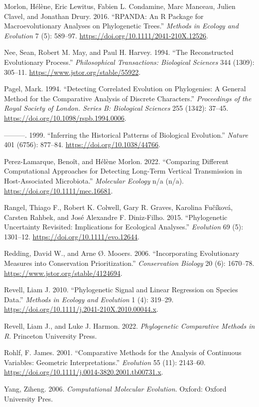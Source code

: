 \documentclass[
]{book}
\newlength{\cslhangindent}
\newenvironment{CSLReferences}[2] %
 {\begin{list}{}{%
  \setlength{\itemindent}{0pt}
  \setlength{\leftmargin}{0pt}
  \setlength{\parsep}{0pt}
  \ifodd #1
   \setlength{\leftmargin}{\cslhangindent}
   \setlength{\itemindent}{-1\cslhangindent}
  \fi
  \setlength{\itemsep}{#2\baselineskip}}}
 {\end{list}}
\begin{document}
\begin{CSLReferences}{1}{0}
Morlon, Hélène, Eric Lewitus, Fabien L. Condamine, Marc Manceau, Julien Clavel, and Jonathan Drury. 2016. {``RPANDA: An R Package for Macroevolutionary Analyses on Phylogenetic Trees.''} \emph{Methods in Ecology and Evolution} 7 (5): 589--97. \url{https://doi.org/10.1111/2041-210X.12526}.

Nee, Sean, Robert M. May, and Paul H. Harvey. 1994. {``The Reconstructed Evolutionary Process.''} \emph{Philosophical Transactions: Biological Sciences} 344 (1309): 305--11. \url{https://www.jstor.org/stable/55922}.

Pagel, Mark. 1994. {``Detecting Correlated Evolution on Phylogenies: A General Method for the Comparative Analysis of Discrete Characters.''} \emph{Proceedings of the Royal Society of London. Series B: Biological Sciences} 255 (1342): 37--45. \url{https://doi.org/10.1098/rspb.1994.0006}.

---------. 1999. {``Inferring the Historical Patterns of Biological Evolution.''} \emph{Nature} 401 (6756): 877--84. \url{https://doi.org/10.1038/44766}.

Perez-Lamarque, Benoît, and Hélène Morlon. 2022. {``Comparing Different Computational Approaches for Detecting Long-Term Vertical Transmission in Host-Associated Microbiota.''} \emph{Molecular Ecology} n/a (n/a). \url{https://doi.org/10.1111/mec.16681}.

Rangel, Thiago F., Robert K. Colwell, Gary R. Graves, Karolina Fučíková, Carsten Rahbek, and José Alexandre F. Diniz-Filho. 2015. {``Phylogenetic Uncertainty Revisited: Implications for Ecological Analyses.''} \emph{Evolution} 69 (5): 1301--12. \url{https://doi.org/10.1111/evo.12644}.

Redding, David W., and Arne Ø. Mooers. 2006. {``Incorporating Evolutionary Measures into Conservation Prioritization.''} \emph{Conservation Biology} 20 (6): 1670--78. \url{https://www.jstor.org/stable/4124694}.

Revell, Liam J. 2010. {``Phylogenetic Signal and Linear Regression on Species Data.''} \emph{Methods in Ecology and Evolution} 1 (4): 319--29. \url{https://doi.org/10.1111/j.2041-210X.2010.00044.x}.

Revell, Liam J., and Luke J. Harmon. 2022. \emph{Phylogenetic Comparative Methods in R}. Princeton University Press.

Rohlf, F. James. 2001. {``Comparative Methods for the Analysis of Continuous Variables: Geometric Interpretations.''} \emph{Evolution} 55 (11): 2143--60. \url{https://doi.org/10.1111/j.0014-3820.2001.tb00731.x}.

Yang, Ziheng. 2006. \emph{Computational Molecular Evolution}. Oxford: Oxford University Pres.

\end{CSLReferences}
\end{document}
